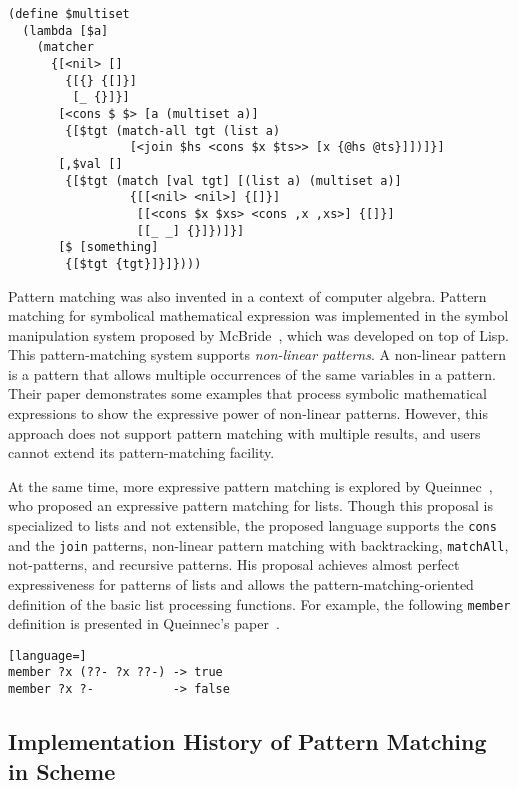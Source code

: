 \documentclass[acmlarge]{acmart}
\begin{document}
\begin{lstlisting}[language=egison]
(define $multiset
  (lambda [$a]
    (matcher
      {[<nil> []
        {[{} {[]}]
         [_ {}]}]
       [<cons $ $> [a (multiset a)]
        {[$tgt (match-all tgt (list a)
                 [<join $hs <cons $x $ts>> [x {@hs @ts}]])]}]
       [,$val []
        {[$tgt (match [val tgt] [(list a) (multiset a)]
                 {[[<nil> <nil>] {[]}]
                  [[<cons $x $xs> <cons ,x ,xs>] {[]}]
                  [[_ _] {}]})]}]
       [$ [something]
        {[$tgt {tgt}]}]})))
\end{lstlisting}

\medskip

Pattern matching was also invented in a context of computer algebra.
Pattern matching for symbolical mathematical expression was implemented in the symbol manipulation system proposed by McBride~\cite{mcbride1969symbol}, which was developed on top of Lisp.
This pattern-matching system supports \emph{non-linear patterns}.
A non-linear pattern is a pattern that allows multiple occurrences of the same variables in a pattern.
Their paper demonstrates some examples that process symbolic mathematical expressions to show the expressive power of non-linear patterns.
However, this approach does not support pattern matching with multiple results, and users cannot extend its pattern-matching facility.

At the same time, more expressive pattern matching is explored by Queinnec~\cite{queinnec1990compilation}, who proposed an expressive pattern matching for lists.
Though this proposal is specialized to lists and not extensible, the proposed language supports the \texttt{cons} and the \texttt{join} patterns, non-linear pattern matching with backtracking, \texttt{matchAll}, not-patterns, and recursive patterns.
His proposal achieves almost perfect expressiveness for patterns of lists and allows the pattern-matching-oriented definition of the basic list processing functions.
For example, the following \texttt{member} definition is presented in Queinnec's paper~\cite{queinnec1990compilation}.

\begin{lstlisting}[language=]
member ?x (??- ?x ??-) -> true
member ?x ?-           -> false
\end{lstlisting}

\subsection{Implementation History of Pattern Matching in Scheme}\label{history2}
\end{document}
